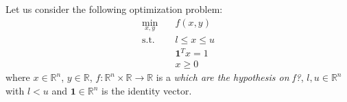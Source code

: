 Let us consider the following optimization problem:
\begin{subequations} 
\begin{align}
\min_{x,y} & \quad f(x,y)  \\
\text{s.t.} & \quad l \leq x \leq u \\
& \quad \mathbf{1}^T x = 1 \\
& \quad x \geq 0
\end{align}
\end{subequations}
where $x \in \mathbb{R}^n$, $y \in \mathbb{R}$, $f:\mathbb{R}^n \times \mathbb{R} \rightarrow \mathbb{R}$ is a \textit{which are the hypothesis on f?}, $l, u \in \mathbb{R}^n$ with $l < u$ and $\mathbf{1} \in \mathbb{R}^n$ is the identity vector.